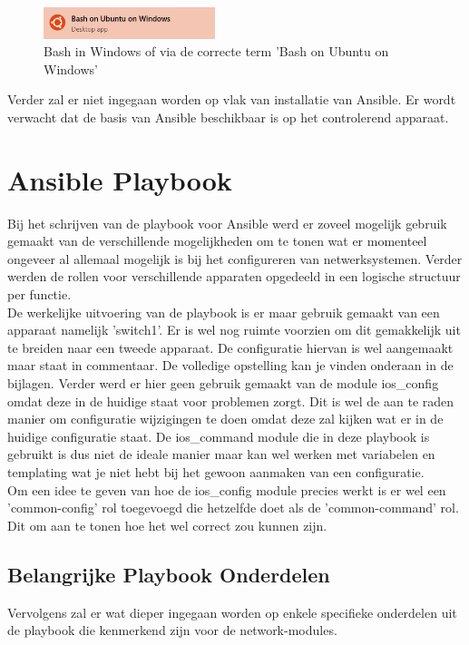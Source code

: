 \begin{figure}[H]
\centering
\includegraphics[width=5cm]{../img/bashonwindows}
\caption{Bash in Windows of via de correcte term 'Bash on Ubuntu on Windows' }
\end{figure}

Verder zal er niet ingegaan worden op vlak van installatie van Ansible. Er wordt verwacht dat de basis van Ansible beschikbaar is op het controlerend apparaat.

\section{Ansible Playbook}
\label{ch:ansibleplaybook}
Bij het schrijven van de playbook voor Ansible werd er zoveel mogelijk gebruik gemaakt van de verschillende mogelijkheden om te tonen wat er momenteel ongeveer al allemaal mogelijk is bij het configureren van netwerksystemen. Verder werden de rollen voor verschillende apparaten opgedeeld in een logische structuur per functie. 
\\

De werkelijke uitvoering van de playbook is er maar gebruik gemaakt van een apparaat namelijk 'switch1'. Er is wel nog ruimte voorzien om dit gemakkelijk uit te breiden naar een tweede apparaat. De configuratie hiervan is wel aangemaakt maar staat in commentaar. De volledige opstelling kan je vinden onderaan in de bijlagen. Verder werd er hier geen gebruik gemaakt van de module ios\_config omdat deze in de huidige staat voor problemen zorgt. Dit is wel de aan te raden manier om configuratie wijzigingen te doen omdat deze zal kijken wat er in de huidige configuratie staat. De ios\_command module die in deze playbook is gebruikt is dus niet de ideale manier maar kan wel werken met variabelen en templating wat je niet hebt bij het gewoon aanmaken van een configuratie.
\\

Om een idee te geven van hoe de ios\_config module precies werkt is er wel een 'common-config' rol toegevoegd die hetzelfde doet als de 'common-command' rol. Dit om aan te tonen hoe het wel correct zou kunnen zijn.

\subsection{Belangrijke Playbook Onderdelen}
\label{ch:ansibleplaybookonderdelen}
Vervolgens zal er wat dieper ingegaan worden op enkele specifieke onderdelen uit de playbook die kenmerkend zijn voor de network-modules.
\\

